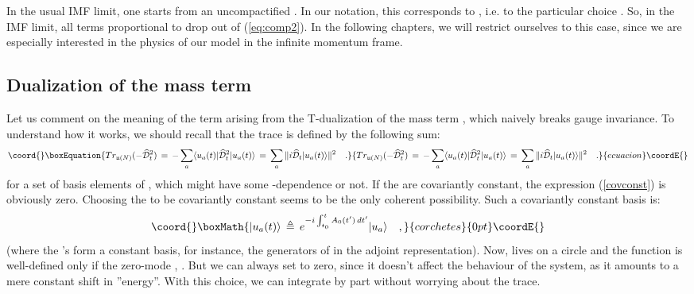 \documentclass[a4paper,11pt]{article}
\def\Z{{\rm Z\kern-.34em Z}}
\begin{document}
In the usual IMF limit, one starts from an uncompactified \coordHE{}. In our notation, this corresponds to 
\coordHE{}, i.e. to the particular choice \coordHE{}. So, in the IMF limit,
all terms proportional to \myHighlight{$\omega$}\coordHE{} drop out of (\ref{eq:comp2}). In the following chapters, we will restrict
ourselves to this case, since we are especially interested in the physics of our model in the infinite
momentum frame.

\subsection{Dualization of the mass term}

Let us comment on the meaning of the \coordHE{} term arising from the T-dualization of 
the mass term \coordHE{}, which naively breaks gauge invariance. To understand how it works, we should 
recall that the trace is defined by the following sum:
\begin{equation}\coord{}\boxEquation{\label{covconst}
Tr_{\frak{u}(N)}(-\mathcal{\widehat{D}}_t^{2})\,=\,-\sum_{a}\langle
u_{a}(t)|\mathcal{\widehat{D}}_{t}^{2}|u_{a}(t)\rangle \,=\,\sum_{a}\Vert
i\mathcal{\widehat{D}}_{t}|u_{a}(t)\rangle \Vert ^{2}\quad .  
}{Tr_{\frak{u}(N)}(-\mathcal{\widehat{D}}_t^{2})\,=\,-\sum_{a}\langle
u_{a}(t)|\mathcal{\widehat{D}}_{t}^{2}|u_{a}(t)\rangle \,=\,\sum_{a}\Vert
i\mathcal{\widehat{D}}_{t}|u_{a}(t)\rangle \Vert ^{2}\quad .  
}{ecuacion}\coordE{}\end{equation}
for a set of basis elements \coordHE{} of \coordHE{}, 
which might have some \coordHE{}-dependence or not. If the \coordHE{} are covariantly constant, 
the expression (\ref{covconst}) is obviously zero. Choosing the \coordHE{} to be covariantly
constant seems to be the only coherent possibility. Such a covariantly constant basis is:
\[\coord{}\boxMath{
|u_{a}(t)\rangle \,\triangleq \,e^{-i\int_{t_{0}}^{t}A_{0}(t^{\prime
})\,dt^{\prime }}|u_{a}\rangle \quad ,
}{corchetes}{0pt}\coordE{}\]
(where the \coordHE{}'s form a constant basis, for instance, the generators of 
\coordHE{} in the adjoint representation). Now, \coordHE{} lives on a circle  and the function 
\coordHE{} is well-defined only if the zero-mode 
\coordHE{}, \myHighlight{$n\in \Z$}\coordHE{}. But we can always set \coordHE{} to zero, since it doesn't 
affect the behaviour of the system, as it amounts to a mere constant shift in ''energy''. 
With this choice, we can integrate \coordHE{} by part without worrying about the trace.
\end{document}
